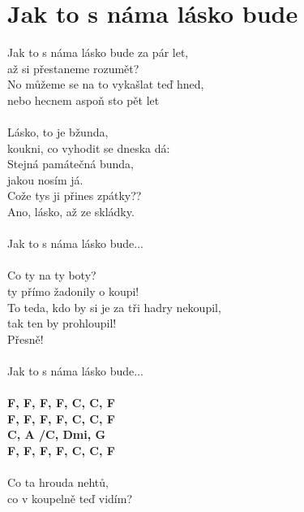 \section{Jak to s náma lásko bude}
\color{blue}
\textcolor{black}{}Jak to s náma \textcolor{black}{}lásko bude \textcolor{black}{}za pár \textcolor{black}{}let,\\
až si \textcolor{black}{}přestaneme \textcolor{black}{}rozu\textcolor{black}{}mět?\\
\color{red}
No můžeme se na to vykašlat teď hned,\\
nebo hecnem aspoň sto pět let\\
\\
\color{blue}
\textcolor{black}{}Lásko, to je \textcolor{black}{}bžunda,\\
koukni, co\textcolor{black}{} vyhodit se dneska \textcolor{black}{}dá:\\
\textcolor{black}{}Stejná \textcolor{black}{}pamá\textcolor{black}{}tečná \textcolor{black}{}bunda,\\
\textcolor{black}{}jakou nosím \textcolor{black}{}já.\\
\color{red}
Cože tys ji přines zpátky??\\
\color{blue}
Ano, lásko, až ze skládky.\\
\\
\color{red}
Jak to s náma lásko bude...\\
\\
Co ty na ty boty?\\
ty přímo žadonily o koupi!\\
\color{blue}
To teda, kdo by si je za tři hadry nekoupil,\\
tak ten by prohloupil!\\
\color{red}
Přesně!\\
\\
\color{blue}
Jak to s náma lásko bude...\\
\color{black}
\\
\footnotesize\textbf{F, F\maj, F\6, F\7, C\kr, C, F\\
F, F\maj, F\6, F\7, C\kr, C, F\\
C, A\7 /C\kr , Dmi, G\7\\
F, F\maj, F\6, F\7, C\kr, C, F}\\
\normalsize
\\
\color{red}
Co ta hrouda nehtů,\\
co v koupelně teď vidím?\\
